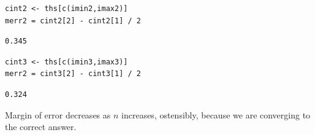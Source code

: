 \documentclass[11pt]{article}
\begin{document}
\begin{verbatim}
cint2 <- ths[c(imin2,imax2)]
merr2 = cint2[2] - cint2[1] / 2
\end{verbatim}

\begin{verbatim}
0.345
\end{verbatim}

\begin{verbatim}
cint3 <- ths[c(imin3,imax3)]
merr2 = cint3[2] - cint3[1] / 2
\end{verbatim}

\begin{verbatim}
0.324
\end{verbatim}

Margin of error decreases as \(n\) increases, ostensibly, because we are converging to the correct answer.
\end{document}
